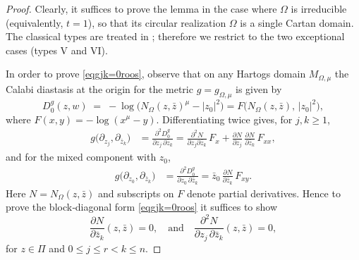 \documentclass[reqno, 11pt]{amsart}
\newcommand{\W}{\Omega}
\begin{document}
\begin{proof}
Clearly, it suffices to prove the lemma in the case where $\Omega$ is irreducible (equivalently, $t=1$), so that its circular realization $\W$ is a single Cartan domain. The classical types are treated in \cite{MOSSAZEDDA2022polch}; therefore we restrict to the two exceptional cases (types V and VI).

In order to prove \eqref{eqgjk=0roos}, observe that on any Hartogs domain \(M_{\Omega,\mu}\) the Calabi diastasis at the origin for the metric \(g=g_{{\Omega,\mu}}\) is  given by
\begin{equation}\label{EQdistagmw}
D_0^{g}(z,w)
\;=\;
-\log\bigl(N_{\Omega}(z,\bar z)^\mu - |z_0|^2\bigr)=
F\bigl(N_{\Omega}(z,\bar z),\,|z_0|^2\bigr),
\end{equation}
where \(F(x,y)=-\log(x^\mu-y)\).
Differentiating twice gives, for $j,k\ge1$,
\begin{equation}\label{eqdedebD1}
\begin{split}
g\bigl(\partial_{z_j},\partial_{\bar z_k}\bigr)
&=\frac{\partial^2D^g_0}{\partial z_j\,\partial\bar z_k}
=\frac{\partial^2N}{\partial z_j\partial\bar z_k}\,F_x
+\frac{\partial N}{\partial z_j}\,\frac{\partial N}{\partial\bar z_k}\,F_{xx},
\end{split}
\end{equation}
and for the mixed component with $z_0$,
\begin{equation}\label{eqdedebD2}
\begin{split}
g\bigl(\partial_{z_0},\partial_{\bar z_k}\bigr)
&=\frac{\partial^2D^g_0}{\partial z_0\,\partial\bar z_k}
=\bar z_0\,\frac{\partial N}{\partial\bar z_k}\,F_{xy}.
\end{split}
\end{equation}
Here $N=N_\Omega(z,\bar z)$ and subscripts on $F$ denote partial derivatives.
Hence to prove the block‐diagonal form \eqref{eqgjk=0roos} it suffices to show
\begin{equation}\label{EQdeNWzk}
\frac{\partial N}{\partial\bar z_k}(z,\bar z)=0,
\quad
\text{and}
\quad
\frac{\partial^2N}{\partial z_j\,\partial\bar z_k}(z,\bar z)=0,
\end{equation}
for $z \in \Pi$ and $0\leq j \leq r < k \leq n$.
 

\end{proof}
\end{document}
